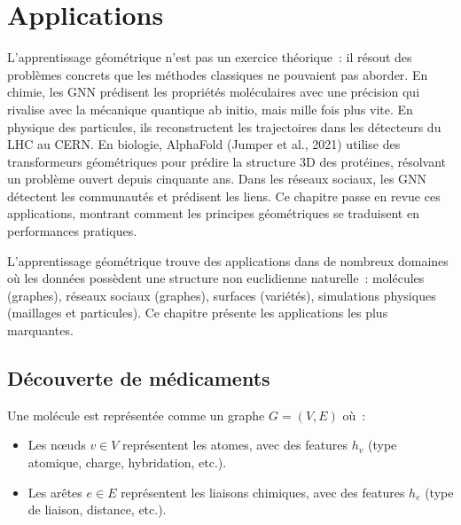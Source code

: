 \chapter{Applications}
\label{ch:applications}

L'apprentissage g\'eom\'etrique n'est pas un exercice th\'eorique~: il r\'esout des probl\`emes concrets que les m\'ethodes classiques ne pouvaient pas aborder. En chimie, les GNN pr\'edisent les propri\'et\'es mol\'eculaires avec une pr\'ecision qui rivalise avec la m\'ecanique quantique ab initio, mais mille fois plus vite. En physique des particules, ils reconstructent les trajectoires dans les d\'etecteurs du LHC au CERN. En biologie, AlphaFold (Jumper et al., 2021) utilise des transformeurs g\'eom\'etriques pour pr\'edire la structure 3D des prot\'eines, r\'esolvant un probl\`eme ouvert depuis cinquante ans. Dans les r\'eseaux sociaux, les GNN d\'etectent les communaut\'es et pr\'edisent les liens. Ce chapitre passe en revue ces applications, montrant comment les principes g\'eom\'etriques se traduisent en performances pratiques.

\begin{intuition}
L'apprentissage g\'eom\'etrique trouve des applications dans de
nombreux domaines o\`u les donn\'ees poss\`edent une structure
non euclidienne naturelle~: mol\'ecules (graphes), r\'eseaux sociaux
(graphes), surfaces (vari\'et\'es), simulations physiques (maillages
et particules). Ce chapitre pr\'esente les applications les plus
marquantes.
\end{intuition}

\section{D\'ecouverte de m\'edicaments}
\label{sec:drug_discovery}

\begin{definition}
Une mol\'ecule est repr\'esent\'ee comme un graphe $G = (V, E)$ o\`u~:
\begin{itemize}
  \item Les n\oe uds $v \in V$ repr\'esentent les atomes, avec des
        features $h_v$ (type atomique, charge, hybridation, etc.).
  \item Les ar\^etes $e \in E$ repr\'esentent les liaisons chimiques,
        avec des features $h_e$ (type de liaison, distance, etc.).
\end{itemize}
\end{definition}

